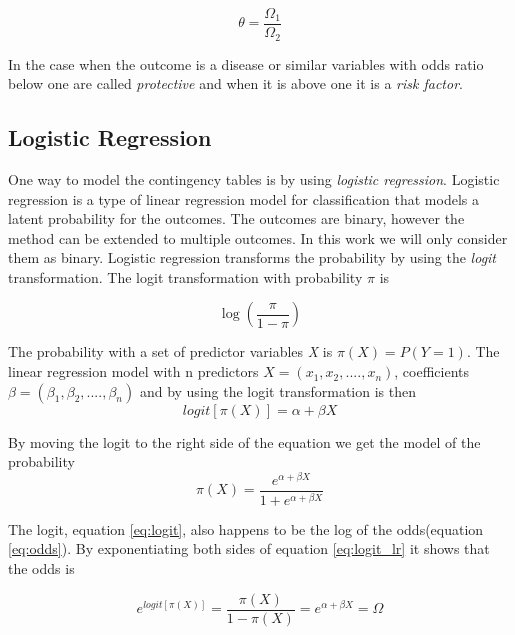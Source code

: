 \documentclass[10pt,a4paper]{report}
\begin{document}
\begin{equation}\label{eq:odds_ratio}
\theta=\frac{\Omega_1}{\Omega_2}
\end{equation}

In the case when the outcome is a disease or similar variables with odds ratio below one are called \emph{protective} and when it is above one it is a \emph{risk factor}\cite{recoding_2011}.

\subsection{Logistic Regression}
One way to model the contingency tables is by using \emph{logistic regression}. Logistic regression is a type of linear regression model for classification that models a latent probability for the outcomes. The outcomes are binary, however the method can be extended to multiple outcomes. In this work we will only consider them as binary. Logistic regression transforms the probability by using the \emph{logit} transformation. The logit transformation with probability $\pi$ is \cite{agresti_categorical}

\begin{equation}\label{eq:logit}
\log(\frac{\pi}{1-\pi})
\end{equation}

The probability with a set of predictor variables \emph{X} is $\pi(X)=P(Y=1)$. The linear regression model with n predictors $X=(x_1,x_2,....,x_n)$, coefficients $\beta=(\beta_1, \beta_2,....,\beta_n)$ and by using the logit transformation is then\cite{agresti_categorical}
\begin{equation}\label{eq:logit_lr}
logit[\pi(X)]=\alpha+\beta X
\end{equation}

By moving the logit to the right side of the equation we get the model of the probability\cite{agresti_categorical}
\begin{equation}
\pi(X)=\frac{e^{\alpha+\beta X}}{1+e^{\alpha+\beta X}}
\end{equation}

The logit, equation \ref{eq:logit}, also happens to be the log of the odds(equation \ref{eq:odds})\cite{agresti_categorical}. By exponentiating both sides of equation \ref{eq:logit_lr} it shows that the odds is \cite{agresti_categorical}

\begin{equation}
e^{logit[\pi(X)]}=\frac{\pi(X)}{1-\pi(X)}=e^{\alpha+\beta X}=\Omega
\end{equation}
\end{document}
